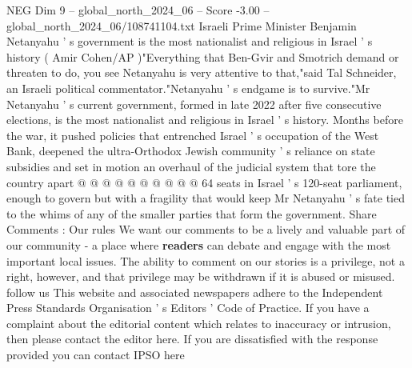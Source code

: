 \begin{textsample}{NEG Dim 9 – global\_north\_2024\_06 – Score -3.00 – global\_north\_2024\_06/108741104.txt}
Israeli Prime Minister Benjamin Netanyahu ' s government is the most nationalist and religious in Israel ' s history ( Amir Cohen/AP )"Everything that Ben-Gvir and Smotrich demand or threaten to do, you see Netanyahu is very attentive to that,"said Tal Schneider, an Israeli political commentator."Netanyahu ' s endgame is to survive."Mr Netanyahu ' s current government, formed in late 2022 after five consecutive elections, is the most nationalist and religious in Israel ' s history.
Months before the war, it pushed policies that entrenched Israel ' s occupation of the West Bank, deepened the ultra-Orthodox Jewish community ' s reliance on state subsidies and set in motion an overhaul of the judicial system that tore the country apart @ @ @ @ @ @ @ @ @ @ 64 seats in Israel ' s 120-seat parliament, enough to govern but with a fragility that would keep Mr Netanyahu ' s fate tied to the whims of any of the smaller parties that form the government.
Share Comments : Our rules We want our comments to be a lively and valuable part of our community - a place where \textbf{readers} can debate and engage with the most important local issues.
The ability to comment on our stories is a privilege, not a right, however, and that privilege may be withdrawn if it is abused or misused. follow us This website and associated newspapers adhere to the Independent Press Standards Organisation ' s Editors ' Code of Practice.
If you have a complaint about the editorial content which relates to inaccuracy or intrusion, then please contact the editor here.
If you are dissatisfied with the response provided you can contact IPSO here

\end{textsample}
